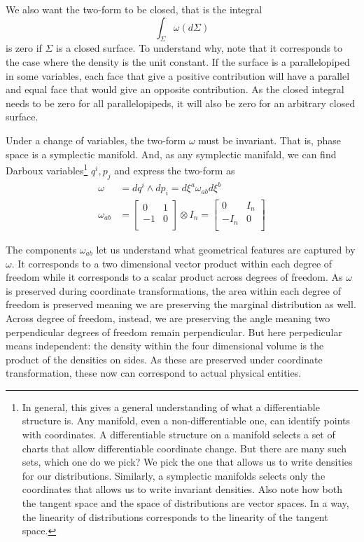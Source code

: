 \documentclass[11pt]{article}
\begin{document}
We also want the two-form to be closed, that is the integral
\begin{equation}
\int_\Sigma \omega(d\Sigma)
\end{equation}
is zero if $\Sigma$ is a closed surface. To understand why, note that it corresponds to the case where the density is the unit constant. If the surface is a parallelopiped in some variables, each face that give a positive contribution will have a parallel and equal face that would give an opposite contribution. As the closed integral needs to be zero for all parallelopipeds, it will also be zero for an arbitrary closed surface.

Under a change of variables, the two-form $\omega$ must be invariant. That is, phase space is a symplectic manifold. And, as any symplectic manifald, we can find Darboux variables\footnote{In general, this gives a general understanding of what a differentiable structure is. Any manifold, even a non-differentiable one, can identify points with coordinates. A differentiable structure on a manifold selects a set of charts that allow differentiable coordinate change. But there are many such sets, which one do we pick? We pick the one that allows us to write densities for our distributions. Similarly, a symplectic manifolds selects only the coordinates that allows us to write invariant densities. Also note how both the tangent space and the space of distributions are vector spaces. In a way, the linearity of distributions corresponds to the linearity of the tangent space.} $q^i, p_j$ and express the two-form as
\begin{equation}
\label{Symplectic}
\begin{aligned}
\omega &= dq^i \wedge dp_i = d\xi^a\omega_{ab}d\xi^b \\
\omega_{ab} &=  \left[
\begin{array}{cc}
0 & 1 \\
-1 & 0 \\
\end{array}
\right] \otimes I_n =
\left[
\begin{array}{cc}
0 & I_n \\
-I_n & 0 \\
\end{array}
\right]
\end{aligned}
\end{equation}

The components $\omega_{ab}$ let us understand what geometrical features are captured by $\omega$. It corresponds to a two dimensional vector product within each degree of freedom while it corresponds to a scalar product across degrees of freedom. As $\omega$ is preserved during coordinate transformations, the area within each degree of freedom is preserved meaning we are preserving the marginal distribution as well. Across degree of freedom, instead, we are preserving the angle meaning two perpendicular degrees of freedom remain perpendicular. But here perpedicular means independent: the density within the four dimensional volume is the product of the densities on sides. As these are preserved under coordinate transformation, these now can correspond to actual physical entities.
\end{document}
